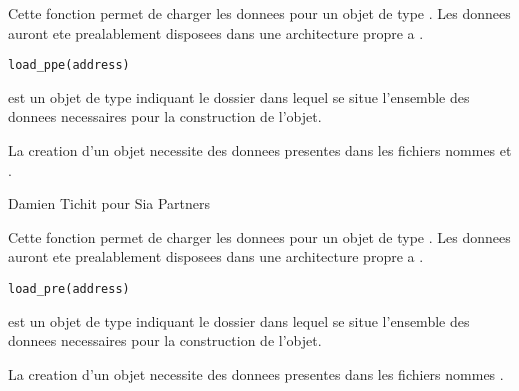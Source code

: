 \documentclass[a4paper]{book}
\begin{document}
%
\begin{Description}\relax
Cette fonction permet de charger les donnees pour un objet de type . Les donnees auront ete prealablement disposees dans
une architecture propre a .
\end{Description}
%
\begin{Usage}
\begin{verbatim}
load_ppe(address)
\end{verbatim}
\end{Usage}
%
\begin{Arguments}
\begin{ldescription}
\item[\code{address}] est un objet de type  indiquant le dossier dans lequel se situe l'ensemble des donnees necessaires
pour la construction de l'objet.
\end{ldescription}
\end{Arguments}
%
\begin{Details}\relax
La creation d'un objet  necessite des donnees presentes dans les fichiers nommes  et .
\end{Details}
%
\begin{Author}\relax
Damien Tichit pour Sia Partners
\end{Author}
%
\begin{Description}\relax
Cette fonction permet de charger les donnees pour un objet de type . Les donnees auront ete prealablement disposees dans
une architecture propre a .
\end{Description}
%
\begin{Usage}
\begin{verbatim}
load_pre(address)
\end{verbatim}
\end{Usage}
%
\begin{Arguments}
\begin{ldescription}
\item[\code{address}] est un objet de type  indiquant le dossier dans lequel se situe l'ensemble des donnees necessaires
pour la construction de l'objet.
\end{ldescription}
\end{Arguments}
%
\begin{Details}\relax
La creation d'un objet  necessite des donnees presentes dans les fichiers nommes .
\end{Details}
\end{document}

